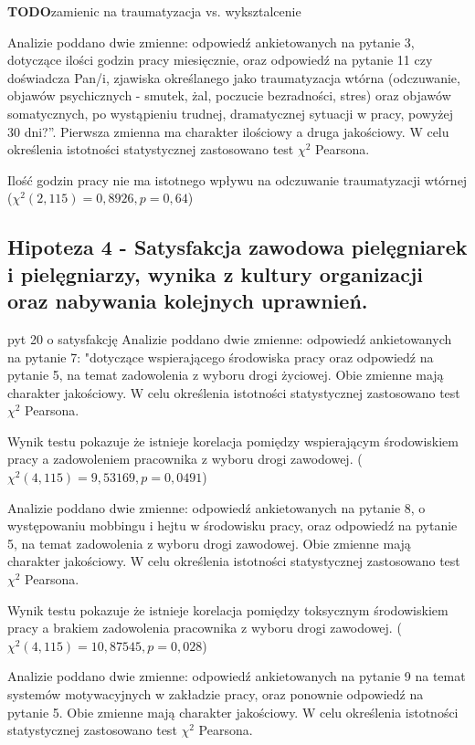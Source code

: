 \documentclass[a4paper,12pt,twoside,openany]{report}
\newcommand{\TODO}{\textbf{TODO}}
\begin{document}
    \TODO zamienic na traumatyzacja vs. wyksztalcenie
    
    Analizie poddano dwie zmienne: odpowiedź ankietowanych na pytanie 3, dotyczące ilości godzin pracy miesięcznie, oraz odpowiedź na pytanie 11 czy doświadcza Pan/i, zjawiska określanego jako traumatyzacja wtórna (odczuwanie, objawów psychicznych - smutek, żal, poczucie bezradności, stres) oraz objawów somatycznych, po wystąpieniu trudnej, dramatycznej sytuacji w pracy, powyżej 30 dni?”. Pierwsza zmienna ma charakter ilościowy a druga jakościowy. W celu określenia istotności statystycznej zastosowano test $\chi^2$ Pearsona. 
 
Ilość godzin pracy nie ma istotnego wpływu na odczuwanie traumatyzacji wtórnej ($\chi^2 (2, 115) = 0,8926, p=0,64$)
\vspace{\baselineskip} 

\subsection*{Hipoteza 4 - Satysfakcja zawodowa pielęgniarek i pielęgniarzy, wynika z kultury organizacji oraz nabywania kolejnych uprawnień.}
pyt 20 o satysfakcję
Analizie poddano dwie zmienne: odpowiedź ankietowanych na pytanie 7: "dotyczące wspierającego środowiska pracy oraz odpowiedź na pytanie 5, na temat zadowolenia z wyboru drogi życiowej. Obie zmienne mają charakter jakościowy. W celu określenia istotności statystycznej zastosowano test $\chi^2$ Pearsona.

Wynik testu pokazuje że istnieje korelacja pomiędzy wspierającym środowiskiem pracy a zadowoleniem pracownika z wyboru drogi zawodowej. ($\chi^2 (4, 115) = 9,53169, p=0,0491$)

\vspace{\baselineskip}

Analizie poddano dwie zmienne: odpowiedź ankietowanych na pytanie 8, o występowaniu mobbingu i hejtu w środowisku pracy, oraz odpowiedź na pytanie 5, na temat zadowolenia z wyboru drogi zawodowej. Obie zmienne mają charakter jakościowy. W celu określenia istotności statystycznej zastosowano test $\chi^2$ Pearsona.

Wynik testu pokazuje że istnieje korelacja pomiędzy toksycznym środowiskiem pracy a brakiem zadowolenia pracownika z wyboru drogi zawodowej. ($\chi^2 (4, 115) = 10,87545, p=0,028$)

\vspace{\baselineskip}
Analizie poddano dwie zmienne: odpowiedź ankietowanych na pytanie 9 na temat systemów motywacyjnych w zakładzie pracy, oraz  ponownie odpowiedź na pytanie 5. Obie zmienne mają charakter jakościowy. W celu określenia istotności statystycznej zastosowano test $\chi^2$ Pearsona.
\end{document}
